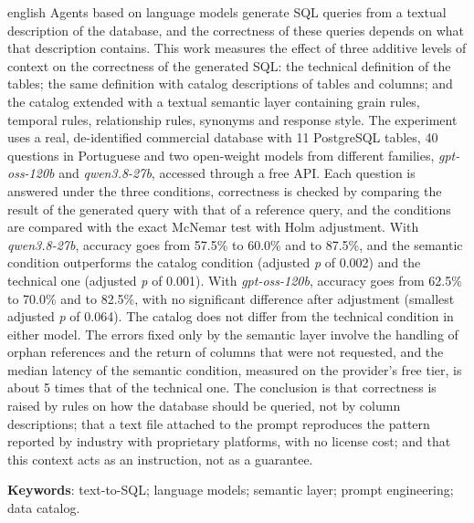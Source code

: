 \begin{resumo}[ABSTRACT]
  \begin{otherlanguage*}{english}
    Agents based on language models generate SQL queries from a textual
    description of the database, and the correctness of these queries
    depends on what that description contains. This work measures the
    effect of three additive levels of context on the correctness of the
    generated SQL: the technical definition of the tables; the same
    definition with catalog descriptions of tables and columns; and the
    catalog extended with a textual semantic layer containing grain rules,
    temporal rules, relationship rules, synonyms and response style. The
    experiment uses a real, de-identified commercial database with 11
    PostgreSQL tables, 40 questions in Portuguese and two open-weight
    models from different families, \textit{gpt-oss-120b} and
    \textit{qwen3.8-27b}, accessed through a free API. Each question is
    answered under the three conditions, correctness is checked by
    comparing the result of the generated query with that of a reference
    query, and the conditions are compared with the exact McNemar test
    with Holm adjustment. With \textit{qwen3.8-27b}, accuracy goes from
    57.5\% to 60.0\% and to 87.5\%, and the semantic condition outperforms
    the catalog condition (adjusted \textit{p} of 0.002) and the technical
    one (adjusted \textit{p} of 0.001). With \textit{gpt-oss-120b},
    accuracy goes from 62.5\% to 70.0\% and to 82.5\%, with no significant
    difference after adjustment (smallest adjusted \textit{p} of 0.064).
    The catalog does not differ from the technical condition in either
    model. The errors fixed only by the semantic layer involve the
    handling of orphan references and the return of columns that were not
    requested, and the median latency of the semantic condition, measured
    on the provider's free tier, is about 5 times that of the technical
    one. The conclusion is that correctness
    is raised by rules on how the database should be queried, not by
    column descriptions; that a text file attached to the prompt
    reproduces the pattern reported by industry with proprietary
    platforms, with no license cost; and that this context acts as an
    instruction, not as a guarantee.

    \vspace{\onelineskip}
    \noindent\textbf{Keywords}: text-to-SQL; language models; semantic
    layer; prompt engineering; data catalog.
  \end{otherlanguage*}
\end{resumo}
